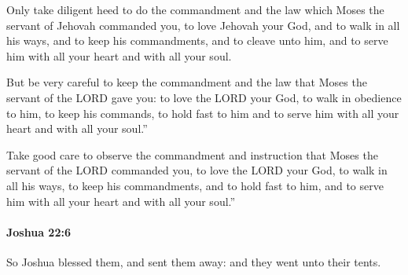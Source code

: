			\begin{versebox}
					\item[BHS] 
					\item[ASV] Only take diligent heed to do the commandment and the law which Moses the servant of Jehovah commanded you, to love Jehovah your God, and to walk in all his ways, and to keep his commandments, and to cleave unto him, and to serve him with all your heart and with all your soul.
					\item[NIV] But be very careful to keep the commandment and the law that Moses the servant of the LORD gave you: to love the LORD your God, to walk in obedience to him, to keep his commands, to hold fast to him and to serve him with all your heart and with all your soul.”
					\item[NRSV] Take good care to observe the commandment and instruction that Moses the servant of the LORD commanded you, to love the LORD your God, to walk in all his ways, to keep his commandments, and to hold fast to him, and to serve him with all your heart and with all your soul.”
			\end{versebox}

		\paragraph{Joshua 22:6} %
			\label{JOSHUA-22-6}

			So Joshua blessed them, and sent them away: and they went unto their tents.

